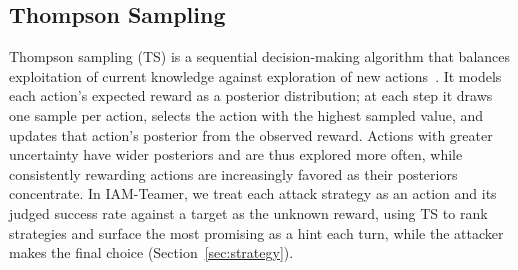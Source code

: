\subsection{Thompson Sampling}

Thompson sampling (TS) is a sequential decision-making algorithm that balances exploitation of current knowledge against exploration of new actions~\cite{thompson}.
It models each action's expected reward as a posterior distribution; at each step it draws one sample per action, selects the action with the highest sampled value, and updates that action's posterior from the observed reward.
Actions with greater uncertainty have wider posteriors and are thus explored more often, while consistently rewarding actions are increasingly favored as their posteriors concentrate.
In IAM-Teamer, we treat each attack strategy as an action and its judged success rate against a target as the unknown reward, using TS to rank strategies and surface the most promising as a hint each turn, while the attacker makes the final choice (Section~\ref{sec:strategy}).
